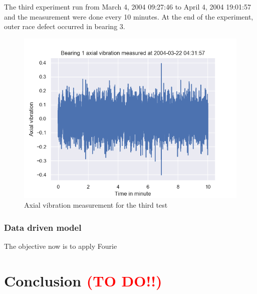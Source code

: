 \documentclass[11pt, oneside]{article}   	%
\begin{document}
\justify
The third experiment run from March 4, 2004 09:27:46 to April 4, 2004 19:01:57 and the measurement were done every 10 minutes. At the end of the experiment, outer race defect occurred in bearing 3.
\begin{figure}[H] %
   \centering
   \includegraphics[width=7in]{thesis-pictures/bearing1-test3} 
   \caption{Axial vibration measurement for the third test}
   \label{fig:example}
\end{figure}

\subsubsection{Data driven model}
The objective now is to apply Fourie






\section{Conclusion   \textcolor{red}{(TO DO!!)}}
\end{document}
